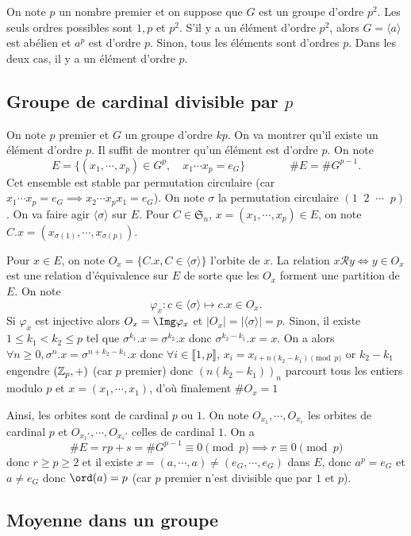 On note $p$ un nombre premier et on suppose que $G$ est un groupe d'ordre $p^2$. Les seuls ordres possibles sont $1, p$ et $p^2$. S'il y a un élément d'ordre $p^2$, alors $G=\langle a\rangle$ est abélien et $a^p$ est d'ordre $p$. Sinon, tous les éléments sont d'ordres $p$. Dans les deux cas, il y a un élément d'ordre $p$.

\subsection{Groupe de cardinal divisible par $p$}

On note $p$ premier et $G$ un groupe d'ordre $kp$. On va montrer qu'il existe un élément d'ordre $p$. Il suffit de montrer qu'un élément est d'ordre $p$. On note \[
    E=\{(x_1, \cdots, x_p)\in G^p, \quad x_1 \cdots x_p=e_G\}\qquad \qquad \#E=\#G^{p-1}.
\]
Cet ensemble est stable par permutation circulaire (car $x_1\cdots x_p=e_G \implies x_2\cdots x_px_1=e_G$). On note $\sigma$ la permutation circulaire $(1\;\; 2 \;\; \cdots \;\; p)$. On va faire agir $\langle \sigma \rangle$ sur $E$. Pour $C\in \mathfrak S_n$, $x=(x_1, \cdots, x_p)\in E$, on note $C.x=(x_{\sigma(1)}, \cdots, x_{\sigma(p)})$.

Pour $x\in E$, on note $O_x=\{C.x, C\in\langle \sigma\rangle\}$ l'orbite de $x$. La relation $x\mathcal Ry\iff y\in O_x$ est une relation d'équivalence sur $E$ de sorte que les $O_x$ forment une partition de $E$. On note \[
    \varphi_x:c\in \langle \sigma \rangle \longmapsto c.x\in O_x.
\]
Si $\varphi_x$ est injective alors $O_x=\Img \varphi_x$ et $|O_x|=|\langle \sigma \rangle|=p$. Sinon, il existe $1\leq k_1 < k_2\leq p$ tel que $\sigma^{k_1}.x=\sigma^{k_2}.x$ donc $\sigma^{k_2-k_1}.x=x$. On a alors $\forall n\geq 0, \sigma^n.x=\sigma^{n+k_2-k_1}.x$ donc $\forall i\in\llbracket 1, p\rrbracket$, $x_i=x_{i+n(k_2-k_1)\pmod p}$ or $k_2-k_1$ engendre $(\mathbb Z_p, +)$ (car $p$ premier) donc $(n(k_2-k_1))_n$ parcourt tous les entiers modulo $p$ et $x=(x_1, \cdots, x_1)$, d'où finalement $\#O_x=1$

Ainsi, les orbites sont de cardinal $p$ ou $1$. On note $O_{x_1}, \cdots, O_{x_r}$ les orbites de cardinal $p$ et $O_{x_1'}, \cdots, O_{x_s'}$ celles de cardinal $1$. On a \[
    \#E=rp+s=\#G^{p-1}\equiv 0\pmod p \implies r\equiv 0\pmod p
\]
donc $r\geq p\geq 2$ et il existe $x=(a, \cdots, a)\neq (e_G, \cdots, e_G)$ dans $E$, donc $a^p=e_G$ et $a\neq e_G$ donc $\ord (a)=p$ (car $p$ premier n'est divisible que par $1$ et $p$).

\subsection{Moyenne dans un groupe}


